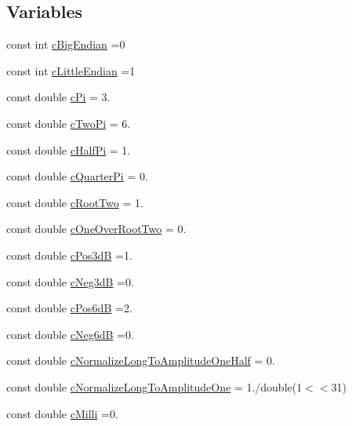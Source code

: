 \subsection*{Variables}
\begin{DoxyCompactItemize}
\item 
const int \hyperlink{a00288_af4c24d9d2042fe4252db5431ef126d00}{c\+Big\+Endian} =0
\item 
const int \hyperlink{a00288_af7fcadf3ad159bf29bbe5a1c494827f2}{c\+Little\+Endian} =1
\item 
const double \hyperlink{a00288_a8e084631426285b3771b32dd9bb0d1a0}{c\+Pi} = 3.
\item 
const double \hyperlink{a00288_a13d2c593bc19660c60caf48961f16361}{c\+Two\+Pi} = 6.
\item 
const double \hyperlink{a00288_a5496b80979f89206ab4966721ef09e07}{c\+Half\+Pi} = 1.
\item 
const double \hyperlink{a00288_ad4d53f57051266ed14dc1632e95cb04e}{c\+Quarter\+Pi} = 0.
\item 
const double \hyperlink{a00288_af5ff0caa18f36334fd5c52e97f4a0cad}{c\+Root\+Two} = 1.
\item 
const double \hyperlink{a00288_a0ae4975165aaf788ed120dbdd82a3cd7}{c\+One\+Over\+Root\+Two} = 0.
\item 
const double \hyperlink{a00288_ad25c51177cb216caae3b4747b028d8ba}{c\+Pos3d\+B} =1.
\item 
const double \hyperlink{a00288_af6f212fd5bb0df08db615fffe4445a3d}{c\+Neg3d\+B} =0.
\item 
const double \hyperlink{a00288_aade00875e4e88b00d991197f574c42ed}{c\+Pos6d\+B} =2.
\item 
const double \hyperlink{a00288_aca5925abc898233b406504d92ee9ef4c}{c\+Neg6d\+B} =0.
\item 
const double \hyperlink{a00288_a93ce2d3935dc06b1c4c887568df84788}{c\+Normalize\+Long\+To\+Amplitude\+One\+Half} = 0.
\item 
const double \hyperlink{a00288_ad30333177ff94148492a02325045a827}{c\+Normalize\+Long\+To\+Amplitude\+One} = 1./double(1$<$$<$31)
\item 
const double \hyperlink{a00288_a1b66f305f76b3f27b75c275c805c3d9b}{c\+Milli} =0.
$$
\end{DoxyCompactItemize}
